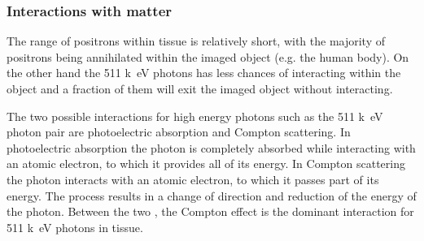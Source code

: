 \begin{table}[htbp]
  \caption{Commonly used radioisotopes and their relevant characteristics for PET imaging.}
\label{tab:radioisotopes}%
\end{table}%

\subsubsection{Interactions with matter}
The range of positrons within tissue is relatively short, with the majority of positrons being annihilated within the imaged object (e.g. the human body).
On the other hand the 511 \si{k\electronvolt} photons has less chances of interacting within the object and a fraction of them will exit the imaged object without interacting. 

The two possible interactions for high energy photons such as the 511 \si{k\electronvolt} photon pair are photoelectric absorption and Compton scattering. In photoelectric absorption the photon is completely absorbed while interacting with an atomic electron, to which it provides all of its energy. In Compton scattering the photon interacts with an atomic electron, to which it passes part of its energy. The process results in a change of direction and reduction of the energy of the photon. Between the two , the Compton effect is the dominant interaction for 511 \si{k\electronvolt} photons in tissue. 

